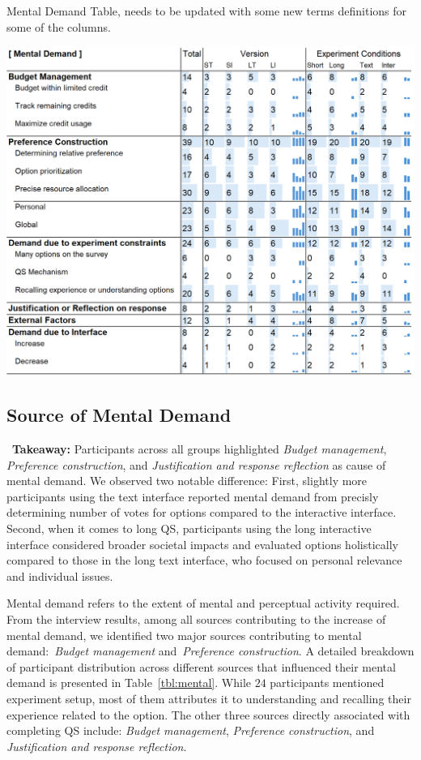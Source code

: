 \begin{table}[h]
    \caption{Mental Demand Table, needs to be updated with some new terms definitions for some of the columns.}
    \label{tbl:mental}
    \includegraphics[width=\linewidth]{content/image/cog/mental_table.png}
\end{table}
\subsection{Source of Mental Demand}
\label{sec:mental}

\vspace{5pt}
\begin{tldrbox}
    \faInfoCircle~\xspace\textbf{Takeaway:} Participants across all groups highlighted \textit{Budget management}, \textit{Preference construction}, and \textit{Justification and response reflection} as cause of mental demand. We observed two notable difference: First, slightly more participants using the text interface reported mental demand from precisly determining number of votes for options compared to the interactive interface. Second, when it comes to long QS, participants using the long interactive interface considered broader societal impacts and evaluated options holistically compared to those in the long text interface, who focused on personal relevance and individual issues. 
\end{tldrbox}

Mental demand refers to the extent of mental and perceptual activity required. From the interview results, among all sources contributing to the increase of mental demand, we identified two major sources contributing to mental demand:~\textit{Budget management} and~\textit{Preference construction}. A detailed breakdown of participant distribution across different sources that influenced their mental demand is presented in Table~\ref{tbl:mental}. While $24$ participants mentioned experiment setup, most of them attributes it to understanding and recalling their experience related to the option. The other three sources directly associated with completing QS include: \textit{Budget management}, \textit{Preference construction}, and \textit{Justification and response reflection}.

